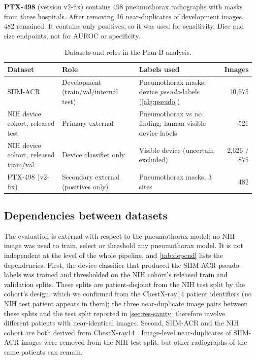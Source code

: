 \documentclass{ieeeaccess}
\begin{document}
\textbf{PTX-498} \cite{wang2021ptx498,wang2021deepsdm} (version v2-fix) contains 498 pneumothorax radiographs with masks from three hospitals. After removing 16 near-duplicates of development images, 482 remained. It contains only positives, so it was used for sensitivity, Dice and size endpoints, not for AUROC or specificity.

\begin{table}[!t]
\centering\small
\caption{Datasets and roles in the Plan B analysis.}
\label{tab:data}
\begin{tabularx}{\linewidth}{@{}l p{3.6cm} X r@{}}
\toprule
Dataset & Role & Labels used & Images \\
\midrule
SIIM-ACR & Development (train/val/internal test) & Pneumothorax masks; device \emph{pseudo}-labels (\cref{alg:pseudo}) & 10{,}675 \\
NIH device cohort, released test & Primary external & Pneumothorax vs no finding; human visible-device labels & 521 \\
NIH device cohort, released train/val & Device classifier only & Visible device (uncertain excluded) & 2{,}626 / 875 \\
PTX-498 (v2-fix) & Secondary external (positives only) & Pneumothorax masks, 3 sites & 482 \\
\bottomrule
\end{tabularx}
\end{table}

\subsection{Dependencies between datasets}
\label{sec:dependencies}
The evaluation is external with respect to the pneumothorax model: no NIH image was used to train, select or threshold any pneumothorax model. It is not independent at the level of the whole pipeline, and \cref{tab:depend} lists the dependencies. First, the device classifier that produced the SIIM-ACR pseudo-labels was trained and thresholded on the NIH cohort's released train and validation splits. These splits are patient-disjoint from the NIH test split by the cohort's design, which we confirmed from the ChestX-ray14 patient identifiers (no NIH test patient appears in them); the three near-duplicate image pairs between these splits and the test split reported in \cref{sec:res-sanity} therefore involve different patients with near-identical images. Second, SIIM-ACR and the NIH cohort are both derived from ChestX-ray14 \cite{wang2017chestxray8}. Image-level near-duplicates of SIIM-ACR images were removed from the NIH test split, but other radiographs of the same patients can remain.
\end{document}
